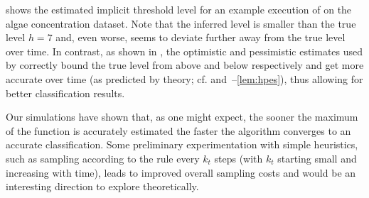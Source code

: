  shows the estimated implicit threshold
level for an example execution of \istr on the algae concentration
dataset. Note that the inferred level
is smaller than the true level $h = 7$ and, even worse, seems to
deviate further away from the true level over time.
In contrast, as shown in , the optimistic
and pessimistic estimates used by \iacl correctly bound the true level
from above and below respectively and get more accurate over time
(as predicted by theory; cf. 
and~--\ref{lem:hpes}),
thus allowing for better classification results.

Our \iacl simulations have shown that, as one might expect, the sooner
the maximum of the function is accurately estimated the faster the
algorithm converges to an accurate classification. Some preliminary
experimentation with simple heuristics, such as sampling according
to the \gpucb rule every $k_t$ steps (with $k_t$ starting small and
increasing with time), leads to improved overall sampling costs and
would be an interesting direction to explore theoretically.

